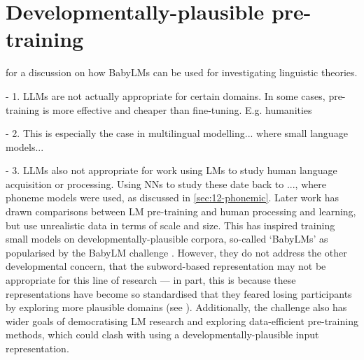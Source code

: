\section{Developmentally-plausible pre-training}\label{sec:12-plausiblepretraining}

\citet{salhancopil2025} for a discussion on how BabyLMs can be used for investigating linguistic theories. 


- 1. LLMs are not actually appropriate for certain domains. In some cases, pre-training is more effective and cheaper than fine-tuning. E.g. humanities

- 2. This is especially the case in multilingual modelling... where small language models...

- 3. LLMs also not appropriate for work using LMs to study human language acquisition or processing. Using NNs to study these date back to ..., where phoneme models were used, as discussed in \cref{sec:12-phonemic}. Later work has drawn comparisons between LM pre-training and human processing and learning, but use unrealistic data in terms of scale and size. This has inspired training small models on developmentally-plausible corpora, so-called `BabyLMs' as popularised by the BabyLM challenge \addcites. However, they do not address the other developmental concern, that the subword-based representation may not be appropriate for this line of research --- in part, this is because these representations have become so standardised that they feared losing participants by exploring more plausible domains (see \citet{wilcox2025}). Additionally, the challenge also has wider goals of democratising LM research and exploring data-efficient pre-training methods, which could clash with using a developmentally-plausible input representation.





